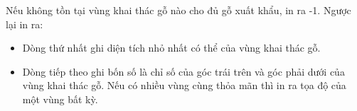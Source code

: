 Nếu không tồn tại vùng khai thác gỗ nào cho đủ gỗ xuất khẩu, in ra -1. Ngược lại in ra:
\begin{itemize}
	\item Dòng thứ nhất ghi diện tích nhỏ nhất có thể của vùng khai thác gỗ.
	\item Dòng tiếp theo ghi bốn số là chỉ số của góc trái trên và góc phải dưới của vùng khai thác gỗ. Nếu có nhiều vùng cùng thỏa mãn thì in ra tọa độ của một vùng bất kỳ.
\end{itemize}